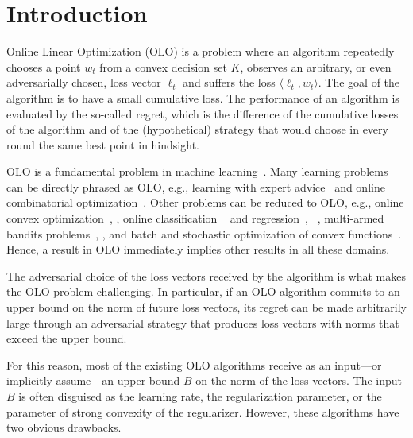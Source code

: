 \section{Introduction}
\label{section:introduction}

Online Linear Optimization (OLO) is a problem where an algorithm repeatedly
chooses a point $w_t$ from a convex decision set $K$, observes an arbitrary, or
even adversarially chosen, loss vector $\ell_t$ and suffers the loss $\langle
\ell_t, w_t \rangle$.  The goal of the algorithm is to have a small cumulative
loss. The performance of an algorithm is evaluated by the so-called regret,
which is the difference of the cumulative losses of the algorithm and of the
(hypothetical) strategy that would choose in every round the same best point in
hindsight.

OLO is a fundamental problem in machine
learning~\cite{Cesa-Bianchi-Lugosi-2006, Rakhlin-Sridharan-2009,
Shalev-Shwartz-2011}.  Many learning problems can be directly phrased as OLO,
e.g., learning with expert advice~\cite{Littlestone-Warmuth-1994, Vovk-1998,
Freund-Schapire-1997, Cesa-Bianchi-Haussler-Helmbold-Schapire-Warmuth-1997}
and online combinatorial optimization~\cite{Kalai-Vempala-2005,
Helmbold-Warmuth-2009, Koolen-Warmuth-Kivinen-2010}. Other problems can be
reduced to OLO, e.g., online convex
optimization~\cite{Abernethy-Bartlett-Rakhlin-Tewari-2008},
\cite[Chapter~2]{Shalev-Shwartz-2011}, online classification
~\cite{Rosenblatt-1958, Freund-Schapire-1999} and
regression~\cite{Kivinen-Warmuth-1997},
~\cite[Chapters~11~and~12]{Cesa-Bianchi-Lugosi-2006}, multi-armed bandits
problems~\cite[Chapter~6]{Cesa-Bianchi-Lugosi-2006},
\cite{Abernethy-Hazan-Rakhlin-2008, Bubeck-Cesa-Bianchi-2012}, and batch and
stochastic optimization of convex functions~\cite{Nemirovski-Yudin-1983,
Bubeck-2015}.  Hence, a result in OLO immediately implies other results in all
these domains.

The adversarial choice of the loss vectors received by the algorithm is what
makes the OLO problem challenging. In particular, if an OLO algorithm commits
to an upper bound on the norm of future loss vectors, its regret can be made
arbitrarily large through an adversarial strategy that produces loss vectors
with norms that exceed the upper bound.

For this reason, most of the existing OLO algorithms receive as an input---or
implicitly assume---an upper bound $B$ on the norm of the loss vectors.  The
input $B$ is often disguised as the learning rate, the regularization
parameter, or the parameter of strong convexity of the regularizer.
However, these algorithms have two obvious drawbacks.

